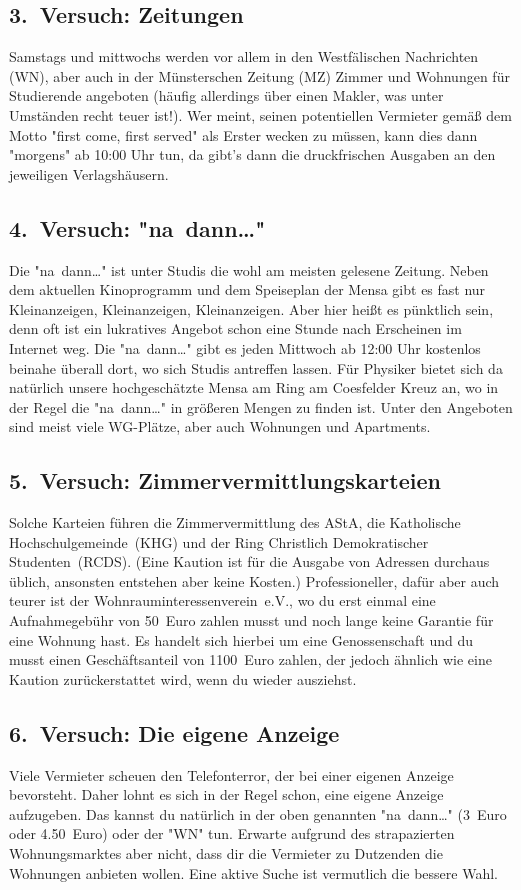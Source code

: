 \begin{multicols*}{2}
\subsection*{3.\ Versuch: Zeitungen}
Samstags und mittwochs werden vor allem in den Westfälischen Nachrichten (WN), aber auch in der Münsterschen Zeitung (MZ) Zimmer und Wohnungen für Studierende angeboten (häufig allerdings über einen Makler, was unter Umständen recht teuer ist!). Wer meint, seinen potentiellen Vermieter gemäß dem Motto "first come, first served" als Erster wecken zu müssen, kann dies dann "morgens" ab 10:00 Uhr tun, da gibt's dann die druckfrischen Ausgaben an den jeweiligen Verlagshäusern.

\subsection*{4.\ Versuch: "na~dann\dots"}
Die "na~dann\dots" ist unter Studis die wohl am meisten gelesene Zeitung. Neben dem aktuellen Kinoprogramm und dem Speiseplan der Mensa gibt es fast nur Kleinanzeigen, Kleinanzeigen, Kleinanzeigen. Aber hier heißt es pünktlich sein, denn oft ist ein lukratives Angebot schon eine Stunde nach Erscheinen im Internet weg. Die "na~dann\dots" gibt es jeden Mittwoch ab 12:00 Uhr kostenlos beinahe überall dort, wo sich Studis antreffen lassen. Für Physiker bietet sich da natürlich unsere hochgeschätzte Mensa am Ring am Coesfelder Kreuz an, wo in der Regel die "na~dann\dots" in größeren Mengen zu finden ist. Unter den Angeboten sind meist viele WG-Plätze, aber auch Wohnungen und Apartments.

\subsection*{5.\ Versuch: Zimmervermittlungskarteien}
Solche Karteien führen die Zimmervermittlung des AStA, die Katholische Hochschulgemeinde~(KHG) und der Ring Christlich Demokratischer Studenten~(RCDS). (Eine Kaution ist für die Ausgabe von Adressen durchaus üblich, ansonsten entstehen aber keine Kosten.) Professioneller, dafür aber auch teurer ist der Wohnrauminteressenverein~e.V., wo du erst einmal eine Aufnahmegebühr von 50~Euro zahlen musst und noch lange keine Garantie für eine Wohnung hast. Es handelt sich hierbei um eine Genossenschaft und du musst einen Geschäftsanteil von 1100~Euro zahlen, der jedoch ähnlich wie eine Kaution zurückerstattet wird, wenn du wieder ausziehst.

\subsection*{6.\ Versuch: Die eigene Anzeige}
Viele Vermieter scheuen den Telefonterror, der bei einer eigenen Anzeige bevorsteht. Daher lohnt es sich in der Regel schon, eine eigene Anzeige aufzugeben. Das kannst du natürlich in der oben genannten "na~dann\dots" (3~Euro oder \num{4,50}~Euro) oder der "WN" tun. Erwarte aufgrund des strapazierten Wohnungsmarktes aber nicht, dass dir die Vermieter zu Dutzenden die Wohnungen anbieten wollen. Eine aktive Suche ist vermutlich die bessere Wahl.


\end{multicols*}
